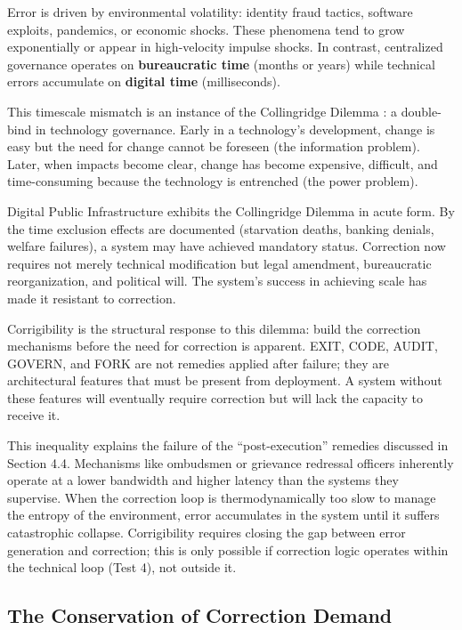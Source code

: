 \documentclass{article}
\begin{document}
Error is driven by environmental volatility: identity fraud tactics, software exploits, pandemics, or economic shocks. These phenomena tend to grow exponentially or appear in high-velocity impulse shocks. In contrast, centralized governance operates on \textbf{bureaucratic time} (months or years) while technical errors accumulate on \textbf{digital time} (milliseconds).

This timescale mismatch is an instance of the Collingridge Dilemma \citep{collingridge1980}: a double-bind in technology governance. Early in a technology's development, change is easy but the need for change cannot be foreseen (the information problem). Later, when impacts become clear, change has become expensive, difficult, and time-consuming because the technology is entrenched (the power problem).

Digital Public Infrastructure exhibits the Collingridge Dilemma in acute form. By the time exclusion effects are documented (starvation deaths, banking denials, welfare failures), a system may have achieved mandatory status. Correction now requires not merely technical modification but legal amendment, bureaucratic reorganization, and political will. The system's success in achieving scale has made it resistant to correction.

Corrigibility is the structural response to this dilemma: build the correction mechanisms before the need for correction is apparent. EXIT, CODE, AUDIT, GOVERN, and FORK are not remedies applied after failure; they are architectural features that must be present from deployment. A system without these features will eventually require correction but will lack the capacity to receive it.

This inequality explains the failure of the ``post-execution'' remedies discussed in Section 4.4. Mechanisms like ombudsmen or grievance redressal officers inherently operate at a lower bandwidth and higher latency than the systems they supervise. When the correction loop is thermodynamically too slow to manage the entropy of the environment, error accumulates in the system until it suffers catastrophic collapse. Corrigibility requires closing the gap between error generation and correction; this is only possible if correction logic operates within the technical loop (Test 4), not outside it.

\subsection{The Conservation of Correction Demand}
\end{document}
